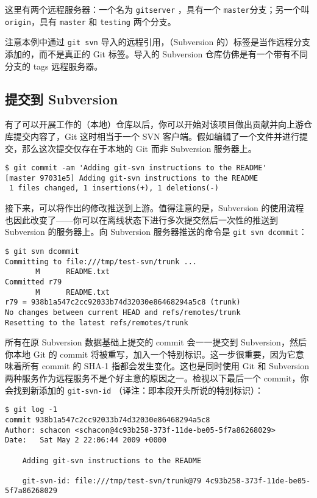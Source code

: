 \documentclass[a4paper]{book}
\begin{document}
这里有两个远程服务器：一个名为 \texttt{gitserver} ，具有一个 \texttt{master}分支；另一个叫 \texttt{origin}，具有 \texttt{master} 和 \texttt{testing} 两个分支。

注意本例中通过 \texttt{git svn} 导入的远程引用，（Subversion 的）标签是当作远程分支添加的，而不是真正的 Git 标签。导入的 Subversion 仓库仿佛是有一个带有不同分支的 tags 远程服务器。

\subsection{提交到 Subversion}

有了可以开展工作的（本地）仓库以后，你可以开始对该项目做出贡献并向上游仓库提交内容了，Git 这时相当于一个 SVN 客户端。假如编辑了一个文件并进行提交，那么这次提交仅存在于本地的 Git 而非 Subversion 服务器上。

\begin{shaded}\begin{verbatim}
$ git commit -am 'Adding git-svn instructions to the README'
[master 97031e5] Adding git-svn instructions to the README
 1 files changed, 1 insertions(+), 1 deletions(-)
\end{verbatim}\end{shaded}

接下来，可以将作出的修改推送到上游。值得注意的是，Subversion 的使用流程也因此改变了------你可以在离线状态下进行多次提交然后一次性的推送到 Subversion 的服务器上。向 Subversion 服务器推送的命令是 \texttt{git svn dcommit}：

\begin{shaded}\begin{verbatim}
$ git svn dcommit
Committing to file:///tmp/test-svn/trunk ...
       M      README.txt
Committed r79
       M      README.txt
r79 = 938b1a547c2cc92033b74d32030e86468294a5c8 (trunk)
No changes between current HEAD and refs/remotes/trunk
Resetting to the latest refs/remotes/trunk
\end{verbatim}\end{shaded}

所有在原 Subversion 数据基础上提交的 commit 会一一提交到 Subversion，然后你本地 Git 的 commit 将被重写，加入一个特别标识。这一步很重要，因为它意味着所有 commit 的 SHA-1 指都会发生变化。这也是同时使用 Git 和 Subversion 两种服务作为远程服务不是个好主意的原因之一。检视以下最后一个 commit，你会找到新添加的 \texttt{git-svn-id} （译注：即本段开头所说的特别标识）：

\begin{shaded}\begin{verbatim}
$ git log -1
commit 938b1a547c2cc92033b74d32030e86468294a5c8
Author: schacon <schacon@4c93b258-373f-11de-be05-5f7a86268029>
Date:   Sat May 2 22:06:44 2009 +0000

    Adding git-svn instructions to the README

    git-svn-id: file:///tmp/test-svn/trunk@79 4c93b258-373f-11de-be05-5f7a86268029
\end{verbatim}\end{shaded}
\end{document}
